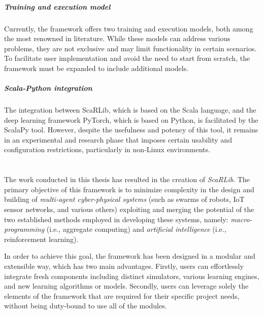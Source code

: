 \documentclass[12pt,a4paper,openright,twoside]{book}
\begin{document}
\paragraph{Training and execution model} 
Currently, the framework offers two training and execution models, both among the most renowned in literature. 
    While these models can address various problems, they are not exclusive and may limit functionality in certain scenarios. 
    To facilitate user implementation and avoid the need to start from scratch, the framework must be expanded 
    to include additional models.

\paragraph{Scala-Python integration}
The integration between ScaRLib, which is based on the Scala language, and the deep learning framework PyTorch, 
    which is based on Python, is facilitated by the ScalaPy tool. However, despite the usefulness and potency of this tool, 
    it remains in an experimental and research phase that imposes certain usability and configuration restrictions, particularly 
    in non-Linux environments.

\chapter{\conclusionsname}
\label{chap:conclusions}
The work conducted in this thesis has resulted in the creation of \emph{ScaRLib}. The primary objective of this framework is to minimize complexity 
    in the design and building of \emph{multi-agent cyber-physical systems} (such as swarms of robots, IoT sensor networks, and various others) 
    exploiting and merging the potential of the two established methods employed in developing these systems, 
    namely: \emph{macro-programming} (i.e., aggregate computing) and \emph{artificial intelligence} (i.e., reinforcement learning).

In order to achieve this goal, the framework has been designed in a modular and extensible way, which has two main advantages.
    Firstly, users can effortlessly integrate fresh components including distinct simulators, various learning engines, and new learning algorithms or models.
    Secondly, users can leverage solely the elements of the framework that are required for their 
    specific project needs, without being duty-bound to use all of the modules.
\end{document}

